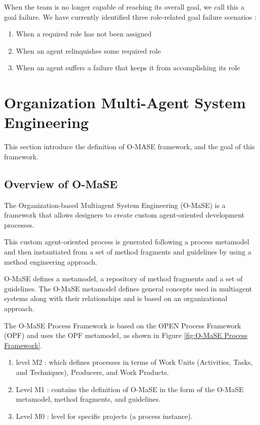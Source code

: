 When the team is no longer capable of reaching its overall goal, 
we call this a goal failure. We have currently identified three role-related goal failure
scenarios \cite{omacs1}:

\begin{enumerate}
	\item When a required role has not been assigned
	\item When an agent relinquishes some required role
	\item When an agent suffers a failure that keeps it from accomplishing its role 
\end{enumerate}
\pagebreak

\section{Organization Multi-Agent System Engineering}
This section introduce the definition of O-MASE framework, and the goal of this framework. 
\subsection{Overview of O-MaSE}
The Organization-based Multiagent System Engineering (O-MaSE) is a framework that 
 allows designers to create custom agent-oriented development processes. 
 
This custom agent-oriented process is generated following a process metamodel 
and then instantiated from a set of method fragments and guidelines 
by using a method engineering approach. 

O-MaSE defines a metamodel, a repository of method fragments and a set of guidelines. 
The O-MaSE metamodel defines general concepts used in multiagent systems
along with their relationships and is based on an organizational approach\cite{omacs6}.
 
The O-MaSE Process Framework is based on the OPEN Process Framework (OPF)
and uses the OPF metamodel, as shown in Figure \ref{fig:O-MaSE Process Framework}\cite{omacs4}.

\begin{enumerate}
\item 
	level M2 : which defines processes in terms of Work Units (Activities, Tasks, and Techniques),
	 Producers, and Work Products.
\item
	Level M1 : contains the definition of O-MaSE in the form of the O-MaSE metamodel, method fragments, and guidelines. 
\item
	Level M0 : level for specific projects (a process instance).
\end{enumerate} 

